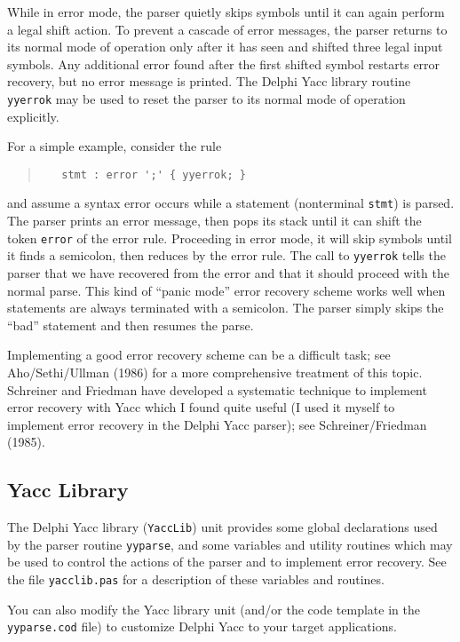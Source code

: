 \documentclass[a4paper]{article}
\begin{document}
While in error mode, the parser quietly skips symbols until it can again
perform a legal shift action. To prevent a cascade of error messages, the
parser returns to its normal mode of operation only after it has seen
and shifted three legal input symbols. Any additional error found after
the first shifted symbol restarts error recovery, but no error message
is printed. The Delphi Yacc library routine \verb"yyerrok" may be used to reset
the parser to its normal mode of operation explicitly.

For a simple example, consider the rule
\begin{quote}\begin{verbatim}
   stmt : error ';' { yyerrok; }
\end{verbatim}\end{quote}
and assume a syntax error occurs while a statement (nonterminal \verb"stmt")
is parsed. The parser prints an error message, then pops its stack until it
can shift the token \verb"error" of the error rule. Proceeding in error mode,
it will skip symbols until it finds a semicolon, then reduces by the error
rule. The call to \verb"yyerrok" tells the parser that we have recovered from
the error and that it should proceed with the normal parse. This kind of
``panic mode'' error recovery scheme works well when statements are always
terminated with a semicolon. The parser simply skips the ``bad'' statement
and then resumes the parse.

Implementing a good error recovery scheme can be a difficult task; see
Aho/Sethi/Ullman (1986) for a more comprehensive treatment of this topic.
Schreiner and Friedman have developed a systematic technique to implement
error recovery with Yacc which I found quite useful (I used it myself
to implement error recovery in the Delphi Yacc parser); see Schreiner/Friedman
(1985).

\subsection{Yacc Library}

The Delphi Yacc library (\verb"YaccLib") unit provides some global declarations
used by the parser routine \verb"yyparse", and some variables and utility
routines which may be used to control the actions of the parser and to
implement error recovery. See the file \verb"yacclib.pas" for a description
of these variables and routines.

You can also modify the Yacc library unit (and/or the code template in the
\verb"yyparse.cod" file) to customize Delphi Yacc to your target applications.
\end{document}
